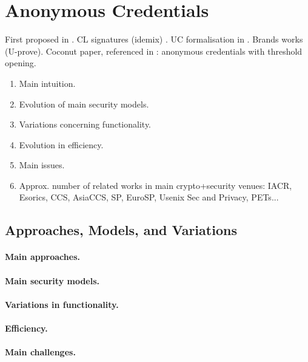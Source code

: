 \section{Anonymous Credentials}
\label{sec:ac}

First proposed in \cite{chau85}.
CL signatures (idemix) \cite{cl01,cl04}.
UC formalisation in \cite{cdhk15}.
Brands works (U-prove).
Coconut paper, referenced in \cite[Section 1]{cdl+20}: anonymous credentials with
threshold opening.

\begin{enumerate}
\item Main intuition.
\item Evolution of main security models.
\item Variations concerning functionality.
\item Evolution in efficiency.
\item Main issues.
\item Approx. number of related works in main crypto+security venues: IACR,
  Esorics, CCS, AsiaCCS, SP, EuroSP, Usenix Sec and Privacy, PETs...
\end{enumerate}

\subsection{Approaches, Models, and Variations}

\paragraph{Main approaches.}

\paragraph{Main security models.}

\paragraph{Variations in functionality.}

\paragraph{Efficiency.}

\paragraph{Main challenges.}

